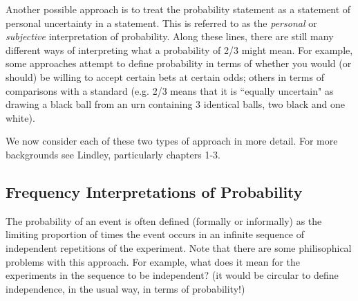 \documentclass{article}[11pt]
\begin{document}
Another possible approach is to treat the probability statement
as a statement of personal uncertainty in a statement. This is referred to as
the {\it personal} or {\it subjective} interpretation of probability. 
Along these lines, there are still many different ways of interpreting what a probability of 2/3 might mean.
For example, some approaches attempt to define probability in terms of whether you would (or should) be willing to accept certain bets at certain odds; others in terms
of comparisons with a standard (e.g. 2/3 means that it is ``equally uncertain" as drawing a black ball from an urn containing 3 identical balls, two black and one white). 

We now consider each of these two types of approach in more detail. For more backgrounds
see Lindley, particularly chapters 1-3.



\subsection{Frequency Interpretations of Probability}

The probability of an event is often defined (formally or informally)
as the limiting proportion of times the event occurs in an infinite
sequence of independent repetitions of the experiment. Note that there are some philisophical problems with this approach. For example, what does it mean for the experiments in the sequence to be
  independent? (it would be circular to define independence, in the
  usual way, in terms of probability!)
\end{document}
